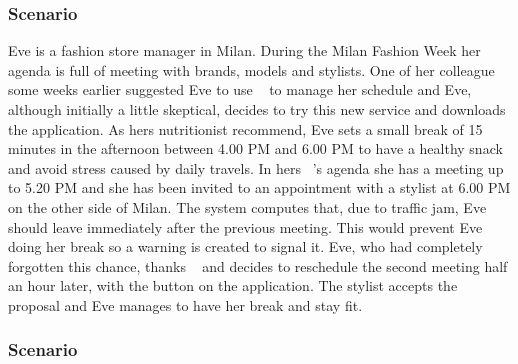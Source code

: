 \subsubsection{Scenario \thecountScenarios }

Eve is a fashion store manager in Milan. During the Milan Fashion Week her agenda is full of meeting with brands, models and stylists. One of her colleague some weeks earlier suggested Eve to use \projectname~ to manage her schedule and Eve, although initially a little skeptical, decides to try this new service and downloads the application. As hers nutritionist recommend, Eve sets a small break of 15 minutes in the afternoon between 4.00 PM and 6.00 PM to have a healthy snack and avoid stress caused by daily travels. In hers \projectname~'s agenda she has a meeting up to 5.20 PM and she has been invited to an appointment with a stylist at 6.00 PM on the other side of Milan. The system computes that, due to traffic jam, Eve should leave immediately after the previous meeting. This would prevent Eve doing her break so a warning is created to signal it. Eve, who had completely forgotten this chance, thanks \projectname~ and decides to reschedule the second meeting half an hour later, with the button on the application. The stylist accepts the proposal and Eve manages to have her break and stay fit.

\subsubsection{Scenario \thecountScenarios }

